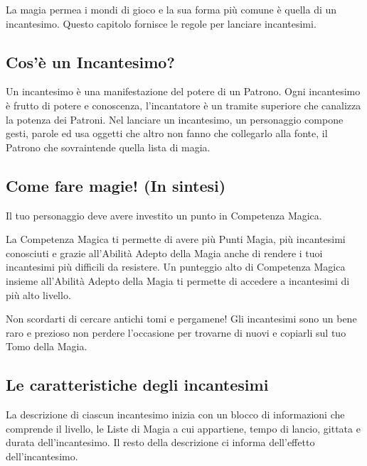 \begin{multicols}{2}

La magia permea i mondi di gioco e la sua forma più comune è quella di un incantesimo. Questo capitolo fornisce le regole per lanciare incantesimi.

\medskip

\subsection{Cos'è un Incantesimo?}

Un incantesimo è una manifestazione del potere di un Patrono. Ogni incantesimo è frutto di potere e conoscenza, l'incantatore è un tramite superiore che canalizza la potenza dei Patroni. Nel lanciare un incantesimo, un personaggio compone gesti, parole ed usa oggetti che altro non fanno che collegarlo alla fonte, il Patrono che sovraintende quella lista di magia.

\subsection{Come fare magie! (In sintesi)}

Il tuo personaggio deve avere investito un punto in Competenza Magica.

La Competenza Magica ti permette di avere più Punti Magia, più incantesimi conosciuti e grazie all'Abilità Adepto della Magia anche di rendere i tuoi incantesimi più difficili da resistere. Un punteggio alto di Competenza Magica insieme all'Abilità Adepto della Magia ti permette di accedere a incantesimi di più alto livello.

Non scordarti di cercare antichi tomi e pergamene! Gli incantesimi sono un bene raro e prezioso non perdere l'occasione per trovarne di nuovi e copiarli sul tuo Tomo della Magia.

\subsection{Le caratteristiche degli incantesimi}\label{caratteristicheincantesimi}

La descrizione di ciascun incantesimo inizia con un blocco di informazioni che comprende il livello, le Liste di Magia a cui appartiene, tempo di lancio, gittata e durata dell'incantesimo. Il resto della descrizione ci informa dell'effetto dell'incantesimo.


\end{multicols}
